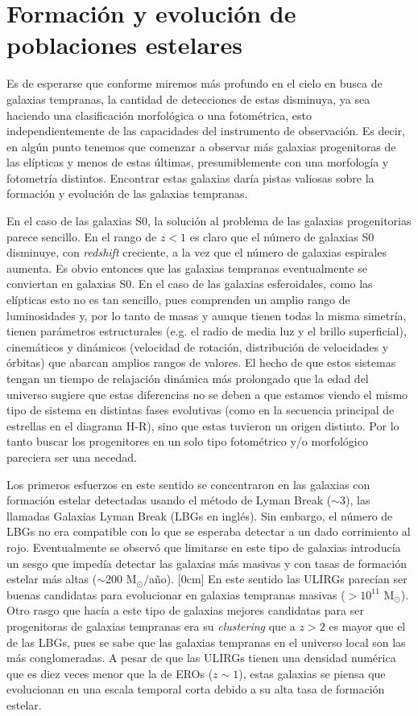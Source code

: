 \documentclass[a4paper,twoside]{article}
\begin{document}
\section{Formación y evolución de poblaciones estelares}

Es de esperarse que conforme miremos más profundo en el cielo en busca de galaxias tempranas, la cantidad de detecciones de estas disminuya, ya sea haciendo una clasificación morfológica o una fotométrica, esto independientemente de las capacidades del instrumento de observación. Es decir, en algún punto tenemos que comenzar a observar más galaxias progenitoras de las elípticas y menos de estas últimas, presumiblemente con una morfología y fotometría distintos. Encontrar estas galaxias daría pistas valiosas sobre la formación y evolución de las galaxias tempranas.

En el caso de las galaxias S0, la solución al problema de las galaxias progenitorias parece sencillo. En el rango de $z<1$ es claro que el número de galaxias S0 disminuye, con \emph{redshift} creciente, a la vez que el número de galaxias espirales aumenta. Es obvio entonces que las galaxias tempranas eventualmente se conviertan en galaxias S0. En el caso de las galaxias esferoidales, como las elípticas esto no es tan sencillo, pues comprenden un amplio rango de luminosidades y, por lo tanto de masas y aunque tienen todas la misma simetría, tienen parámetros estructurales (e.g. el radio de media luz y el brillo superficial), cinemáticos y dinámicos (velocidad de rotación, distribución de velocidades y órbitas) que abarcan amplios rangos de valores. El hecho de que estos sistemas tengan un tiempo de relajación dinámica más prolongado que la edad del universo sugiere que estas diferencias no se deben a que estamos viendo el mismo tipo de sistema en distintas fases evolutivas (como en la secuencia principal de estrellas en el diagrama H-R), sino que estas tuvieron un origen distinto. Por lo tanto buscar los progenitores en un solo tipo fotométrico y/o morfológico pareciera ser una necedad.

Los primeros esfuerzos en este sentido se concentraron en las galaxias con formación estelar detectadas usando el método de Lyman Break ($\sim3$), las llamadas Galaxias Lyman Break (LBGs en inglés). Sin embargo, el número de LBGs no era compatible con lo que se esperaba detectar a un dado corrimiento al rojo. Eventualmente se observó que limitarse en este tipo de galaxias introducía un sesgo que impedía detectar las galaxias más masivas y con tasas de formación estelar más altas ($\sim200$ M${}_\odot/$año). [0cm] En este sentido las ULIRGs parecían ser buenas candidatas para evolucionar en galaxias tempranas masivas ($>10^{11}$ M${}_\odot$). Otro rasgo que hacía a este tipo de galaxias mejores candidatas para ser progenitoras de galaxias tempranas era su \emph{clustering} que a $z>2$ es mayor que el de las LBGs, pues se sabe que las galaxias tempranas en el universo local son las más conglomeradas. A pesar de que las ULIRGs tienen una densidad numérica que es diez veces menor que la de EROs ($z\sim1$), estas galaxias se piensa que evolucionan en una escala temporal corta debido a su alta tasa de formación estelar.
\end{document}
